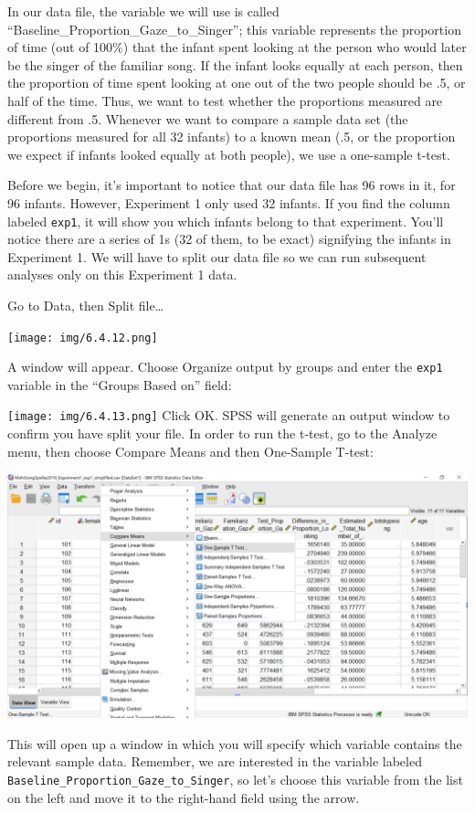 \documentclass[]{book}
\begin{document}
In our data file, the variable we will use is called
``Baseline\_Proportion\_Gaze\_to\_Singer''; this variable represents the
proportion of time (out of 100\%) that the infant spent looking at the
person who would later be the singer of the familiar song. If the infant
looks equally at each person, then the proportion of time spent looking
at one out of the two people should be .5, or half of the time. Thus, we
want to test whether the proportions measured are different from .5.
Whenever we want to compare a sample data set (the proportions measured
for all 32 infants) to a known mean (.5, or the proportion we expect if
infants looked equally at both people), we use a one-sample t-test.

Before we begin, it's important to notice that our data file has 96 rows
in it, for 96 infants. However, Experiment 1 only used 32 infants. If
you find the column labeled \texttt{exp1}, it will show you which
infants belong to that experiment. You'll notice there are a series of
1s (32 of them, to be exact) signifying the infants in Experiment 1. We
will have to split our data file so we can run subsequent analyses only
on this Experiment 1 data.

Go to {Data}, then {Split file\ldots{}}

\texttt{[image: img/6.4.12.png]}

A window will appear. Choose {Organize output by groups} and enter the
\texttt{exp1} variable in the ``Groups Based on'' field:

\texttt{[image: img/6.4.13.png]} Click {OK}. SPSS will generate an
output window to confirm you have split your file. In order to run the
t-test, go to the {Analyze} menu, then choose {Compare Means} and then
{One-Sample T-test}:

\includegraphics{img/6.4.14.png}

This will open up a window in which you will specify which variable
contains the relevant sample data. Remember, we are interested in the
variable labeled \texttt{Baseline\_Proportion\_Gaze\_to\_Singer}, so
let's choose this variable from the list on the left and move it to the
right-hand field using the arrow.
\end{document}
